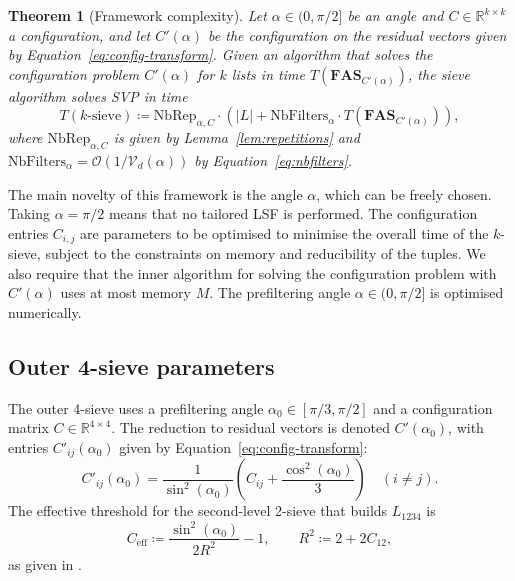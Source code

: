\documentclass[10pt,a4paper]{article}
\newtheorem{theorem}{Theorem}
\begin{document}
\begin{theorem}[Framework complexity]
\label{thm:framework}
Let \(\alpha\in(0,\pi/2]\) be an angle and \(C\in\mathbb{R}^{k\times k}\) a configuration, and let \(C'(\alpha)\) be the configuration on the residual vectors given by Equation~\eqref{eq:config-transform}. Given an algorithm that solves the configuration problem \(C'(\alpha)\) for \(k\) lists in time \(T(\mathbf{FAS}_{C'(\alpha)})\), the sieve algorithm solves SVP in time
\begin{equation}
T(k\text{-sieve}) \coloneqq \mathrm{NbRep}_{\alpha,C}\cdot\left(|L| + \mathrm{NbFilters}_{\alpha}\cdot T(\mathbf{FAS}_{C'(\alpha)})\right),
\label{eq:framework-time}
\end{equation}
where \(\mathrm{NbRep}_{\alpha,C}\) is given by Lemma~\ref{lem:repetitions} and \(\mathrm{NbFilters}_{\alpha}=\mathcal{O}(1/\mathcal{V}_d(\alpha))\) by Equation~\eqref{eq:nbfilters}.
\end{theorem}

The main novelty of this framework is the angle \(\alpha\), which can be freely chosen. Taking \(\alpha=\pi/2\) means that no tailored LSF is performed. The configuration entries \(C_{i,j}\) are parameters to be optimised to minimise the overall time of the \(k\)-sieve, subject to the constraints on memory and reducibility of the tuples. We also require that the inner algorithm for solving the configuration problem with \(C'(\alpha)\) uses at most memory \(M\). The prefiltering angle \(\alpha\in(0,\pi/2]\) is optimised numerically.

\subsection{Outer 4-sieve parameters}
\label{sec:outer-params}

The outer 4-sieve uses a prefiltering angle \(\alpha_0 \in [\pi/3,\pi/2]\) and a configuration matrix \(C \in \mathbb{R}^{4\times 4}\). The reduction to residual vectors is denoted \(C'(\alpha_0)\), with entries \(C'_{ij}(\alpha_0)\) given by Equation~\eqref{eq:config-transform}:
\begin{equation}
C'_{ij}(\alpha_0) = \frac{1}{\sin^2(\alpha_0)}\left(C_{ij} + \frac{\cos^2(\alpha_0)}{3}\right) \quad (i \neq j).
\end{equation}
The effective threshold for the second-level 2-sieve that builds \(L_{1234}\) is
\begin{equation}
C_{\mathrm{eff}} \coloneqq \frac{\sin^2(\alpha_0)}{2R^2} - 1, \qquad R^2 \coloneqq 2 + 2C_{12},
\end{equation}
as given in \cite[Lemma~6]{CL23}.
\end{document}
